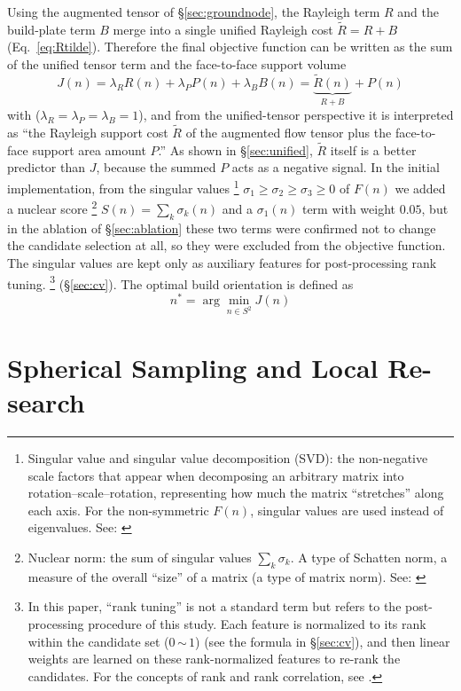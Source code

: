 \documentclass[11pt,a4paper]{article}
\begin{document}
Using the augmented tensor of \S\ref{sec:groundnode}, the Rayleigh term $R$ and the build-plate term $B$
merge into a single unified Rayleigh cost $\tilde R=R+B$ (Eq.~\eqref{eq:Rtilde}).
Therefore the final objective function can be written as the sum of the unified tensor term and the face-to-face support volume
\begin{equation}
J(n)
=
\lambda_R R(n)
+
\lambda_P P(n)
+
\lambda_B B(n)
=
\underbrace{\tilde R(n)}_{R+B}
+
P(n)
\end{equation}
with ($\lambda_R=\lambda_P=\lambda_B=1$),
and from the unified-tensor perspective it is interpreted as ``the Rayleigh support cost $\tilde R$ of the augmented flow tensor
plus the face-to-face support area amount $P$.''
As shown in \S\ref{sec:unified}, $\tilde R$ itself is a better predictor than $J$,
because the summed $P$ acts as a negative signal.
In the initial implementation, from the singular values%
\footnote{Singular value and singular value decomposition (SVD): the non-negative scale factors that appear when decomposing an arbitrary matrix into rotation--scale--rotation,
representing how much the matrix ``stretches'' along each axis.
For the non-symmetric $F(n)$, singular values are used instead of eigenvalues. See: \cite{golubvanloan}}
$\sigma_1\ge\sigma_2\ge\sigma_3\ge0$ of $F(n)$
we added a nuclear score%
\footnote{Nuclear norm: the sum of singular values $\sum_k\sigma_k$. A type of Schatten norm,
a measure of the overall ``size'' of a matrix (a type of matrix norm). See: \cite{hornjohnson}}
$S(n)=\sum_k\sigma_k(n)$ and a $\sigma_1(n)$ term with weight $0.05$, but
in the ablation of \S\ref{sec:ablation} these two terms were confirmed not to change the candidate selection at all, so they were excluded from the objective function.
The singular values are kept only as auxiliary features for post-processing rank tuning.%
\footnote{In this paper, ``rank tuning'' is not a standard term but refers to the post-processing procedure of this study.
Each feature is normalized to its rank within the candidate set ($0$\,$\sim$\,$1$) (see the formula in \S\ref{sec:cv}),
and then linear weights are learned on these rank-normalized features to re-rank the candidates.
For the concepts of rank and rank correlation, see \cite{spearman1904}.}
(\S\ref{sec:cv}).
The optimal build orientation is defined as
\begin{equation}
n^* = \arg\min_{n\in S^2} J(n)
\end{equation}

\section{Spherical Sampling and Local Re-search}
\end{document}
